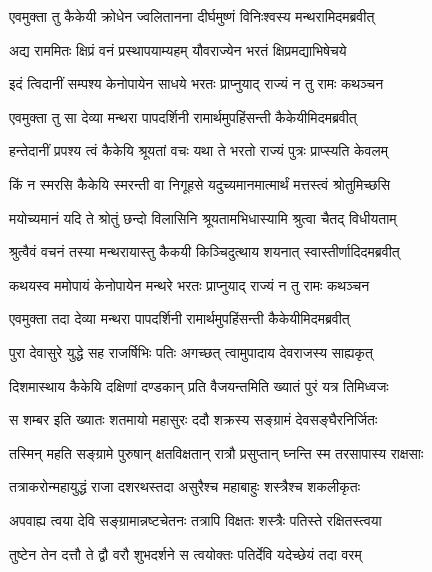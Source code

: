
\twolineshloka
{एवमुक्ता तु कैकेयी क्रोधेन ज्वलितानना}
{दीर्घमुष्णं विनिःश्वस्य मन्थरामिदमब्रवीत्} %

\twolineshloka
{अद्य राममितः क्षिप्रं वनं प्रस्थापयाम्यहम्}
{यौवराज्येन भरतं क्षिप्रमद्याभिषेचये} %

\twolineshloka
{इदं त्विदानीं सम्पश्य केनोपायेन साधये}
{भरतः प्राप्नुयाद् राज्यं न तु रामः कथञ्चन} %

\twolineshloka
{एवमुक्ता तु सा देव्या मन्थरा पापदर्शिनी}
{रामार्थमुपहिंसन्ती कैकेयीमिदमब्रवीत्} %

\twolineshloka
{हन्तेदानीं प्रपश्य त्वं कैकेयि श्रूयतां वचः}
{यथा ते भरतो राज्यं पुत्रः प्राप्स्यति केवलम्} %

\twolineshloka
{किं न स्मरसि कैकेयि स्मरन्ती वा निगूहसे}
{यदुच्यमानमात्मार्थं मत्तस्त्वं श्रोतुमिच्छसि} %

\twolineshloka
{मयोच्यमानं यदि ते श्रोतुं छन्दो विलासिनि}
{श्रूयतामभिधास्यामि श्रुत्वा चैतद् विधीयताम्} %

\twolineshloka
{श्रुत्वैवं वचनं तस्या मन्थरायास्तु कैकयी}
{किञ्चिदुत्थाय शयनात् स्वास्तीर्णादिदमब्रवीत्} %

\twolineshloka
{कथयस्व ममोपायं केनोपायेन मन्थरे}
{भरतः प्राप्नुयाद् राज्यं न तु रामः कथञ्चन} %

\twolineshloka
{एवमुक्ता तदा देव्या मन्थरा पापदर्शिनी}
{रामार्थमुपहिंसन्ती कैकेयीमिदमब्रवीत्} %

\twolineshloka
{पुरा देवासुरे युद्धे सह राजर्षिभिः पतिः}
{अगच्छत् त्वामुपादाय देवराजस्य साह्यकृत्} %

\twolineshloka
{दिशमास्थाय कैकेयि दक्षिणां दण्डकान् प्रति}
{वैजयन्तमिति ख्यातं पुरं यत्र तिमिध्वजः} %

\twolineshloka
{स शम्बर इति ख्यातः शतमायो महासुरः}
{ददौ शक्रस्य सङ्ग्रामं देवसङ्घैरनिर्जितः} %

\twolineshloka
{तस्मिन् महति सङ्ग्रामे पुरुषान् क्षतविक्षतान्}
{रात्रौ प्रसुप्तान् घ्नन्ति स्म तरसापास्य राक्षसाः} %

\twolineshloka
{तत्राकरोन्महायुद्धं राजा दशरथस्तदा}
{असुरैश्च महाबाहुः शस्त्रैश्च शकलीकृतः} %

\twolineshloka
{अपवाह्य त्वया देवि सङ्ग्रामान्नष्टचेतनः}
{तत्रापि विक्षतः शस्त्रैः पतिस्ते रक्षितस्त्वया} %

\twolineshloka
{तुष्टेन तेन दत्तौ ते द्वौ वरौ शुभदर्शने}
{स त्वयोक्तः पतिर्देवि यदेच्छेयं तदा वरम्} %

